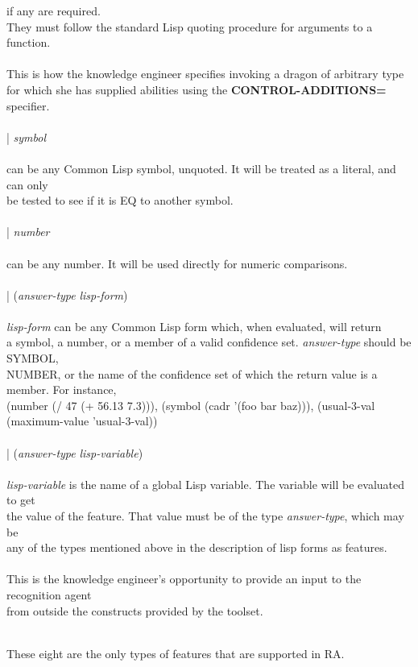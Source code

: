 \begin{tabbing}
if any are required. \\
\>\>\>They must follow the standard Lisp quoting procedure for arguments
to a function. \\
\\
\>\>This is how the knowledge engineer specifies invoking a dragon of
arbitrary type \\
\>\>for which she has supplied abilities using the {\bf CONTROL-ADDITIONS=} specifier. \\
\\
\>| {\it symbol\/} \\
\\
\> can be any Common Lisp symbol, unquoted.  It will be treated
as a literal, and can only\\
\>\>be tested to see if it is EQ to another symbol.\\
\\
\>| {\it number\/} \\
\\
\> can be any number. It will be used directly for
numeric comparisons.\\
\\
\>| ({\it answer-type} {\it lisp-form})\\
\\
\>\> {\it lisp-form} can be any Common Lisp form which, when
evaluated, will return \\
\>\>a symbol, a number, or a member of a valid confidence set. {\it
answer-type} should be SYMBOL, \\
\>\>NUMBER, or the name of the confidence set of which the return
value is a member. For instance, \\
\>\>(number (/ 47 (+ 56.13 7.3))), (symbol (cadr '(foo bar baz))),
(usual-3-val (maximum-value 'usual-3-val)) \\
\\
\>| ({\it answer-type} {\it lisp-variable\/})\\
\\
\>\> {\it lisp-variable} is the name of a global Lisp variable. The
variable will be evaluated to get \\
\>\>the value of the feature. That value must be of the type {\it
answer-type}, which may be \\
\>\>any of the types mentioned above in the description of lisp forms
as features. \\
\\
\>\>\>This is the knowledge engineer's opportunity to provide an input
to the recognition agent \\
\>\>\>from outside the constructs provided by the toolset. \\
\\
\end{tabbing}
These eight are the only types of features that are supported in RA.


